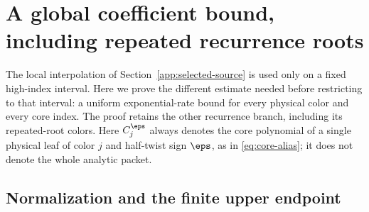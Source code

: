 \section{A global coefficient bound, including repeated recurrence roots}
\label{app:global-core-envelope}

The local interpolation of Section~\ref{app:selected-source} is used
only on a fixed high-index interval. Here we prove the different estimate
needed before restricting to that interval: a uniform exponential-rate
bound for every physical color and every core index. The proof retains
the other recurrence branch, including its repeated-root colors.
Here $C_j^\eps$ always denotes the core polynomial of a single physical
leaf of color $j$ and half-twist sign $\eps$, as in
\eqref{eq:core-alias}; it does not denote the whole analytic packet.

\subsection{Normalization and the finite upper endpoint}

